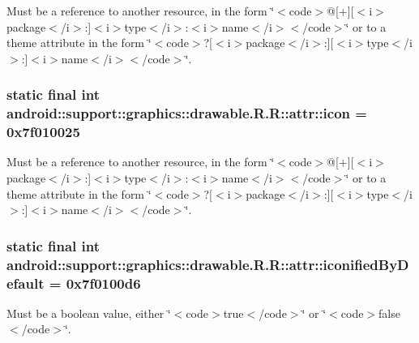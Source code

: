 Must be a reference to another resource, in the form \char`\"{}$<$code$>$@\mbox{[}+\mbox{]}\mbox{[}$<$i$>$package$<$/i$>$:\mbox{]}$<$i$>$type$<$/i$>$:$<$i$>$name$<$/i$>$$<$/code$>$\char`\"{} or to a theme attribute in the form \char`\"{}$<$code$>$?\mbox{[}$<$i$>$package$<$/i$>$:\mbox{]}\mbox{[}$<$i$>$type$<$/i$>$:\mbox{]}$<$i$>$name$<$/i$>$$<$/code$>$\char`\"{}. \hypertarget{classandroid_1_1support_1_1graphics_1_1drawable_1_1_r_1_1attr_a6d5e6570ceefe45c6a357dfd43c906f}{
\subsubsection[{icon}]{\setlength{\rightskip}{0pt plus 5cm}static final int android::support::graphics::drawable.R.R::attr::icon = 0x7f010025}}
\label{classandroid_1_1support_1_1graphics_1_1drawable_1_1_r_1_1attr_a6d5e6570ceefe45c6a357dfd43c906f}


Must be a reference to another resource, in the form \char`\"{}$<$code$>$@\mbox{[}+\mbox{]}\mbox{[}$<$i$>$package$<$/i$>$:\mbox{]}$<$i$>$type$<$/i$>$:$<$i$>$name$<$/i$>$$<$/code$>$\char`\"{} or to a theme attribute in the form \char`\"{}$<$code$>$?\mbox{[}$<$i$>$package$<$/i$>$:\mbox{]}\mbox{[}$<$i$>$type$<$/i$>$:\mbox{]}$<$i$>$name$<$/i$>$$<$/code$>$\char`\"{}. \hypertarget{classandroid_1_1support_1_1graphics_1_1drawable_1_1_r_1_1attr_173e59b074787c4f61b24593026c58b3}{
\subsubsection[{iconifiedByDefault}]{\setlength{\rightskip}{0pt plus 5cm}static final int android::support::graphics::drawable.R.R::attr::iconifiedByDefault = 0x7f0100d6}}
\label{classandroid_1_1support_1_1graphics_1_1drawable_1_1_r_1_1attr_173e59b074787c4f61b24593026c58b3}


Must be a boolean value, either \char`\"{}$<$code$>$true$<$/code$>$\char`\"{} or \char`\"{}$<$code$>$false$<$/code$>$\char`\"{}. 

